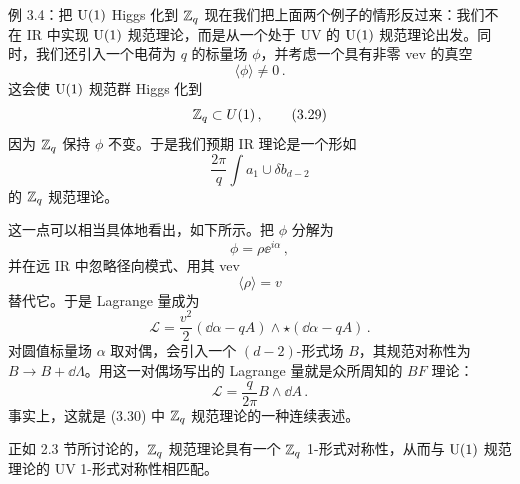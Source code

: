 \begin{examplebox}{例 3.4：把 $\mathrm{U}(1)$ Higgs 化到 $\mathbb{Z}_q$}
现在我们把上面两个例子的情形反过来：我们不在 IR 中实现 $\mathrm{U}(1)$ 规范理论，而是从一个处于 UV 的 $\mathrm{U}(1)$ 规范理论出发。同时，我们还引入一个电荷为 $q$ 的标量场 $\phi$，并考虑一个具有非零 vev 的真空
\begin{equation}
  \langle\phi\rangle\neq 0\,. \tag{3.28}
\end{equation}
这会使 $\mathrm{U}(1)$ 规范群 Higgs 化到
\begin{equation}
  \mathbb{Z}_q\subset U(1)\,, \tag{3.29}
\end{equation}
因为 $\mathbb{Z}_q$ 保持 $\phi$ 不变。于是我们预期 IR 理论是一个形如
\begin{equation}
  \frac{2\pi}{q}\int a_1\cup\delta b_{d-2} \tag{3.30}
\end{equation}
的 $\mathbb{Z}_q$ 规范理论。

这一点可以相当具体地看出，如下所示。把 $\phi$ 分解为
\begin{equation}
  \phi=\rho \ee^{i\alpha}\,, \tag{3.31}
\end{equation}
并在远 IR 中忽略径向模式、用其 vev
\begin{equation}
  \langle\rho\rangle=v \tag{3.32}
\end{equation}
替代它。于是 Lagrange 量成为
\begin{equation}
  \mathcal{L}=\frac{v^2}{2}(\dd\alpha-qA)\wedge\star(\dd\alpha-qA)\,. \tag{3.33}
\end{equation}
对圆值标量场 $\alpha$ 取对偶，会引入一个 $(d-2)$-形式场 $B$，其规范对称性为 $B\to B+\dd\Lambda$。用这一对偶场写出的 Lagrange 量就是众所周知的 $BF$ 理论：
\begin{equation}
  \mathcal{L}=\frac{q}{2\pi}B\wedge \dd A\,. \tag{3.34}
\end{equation}
事实上，这就是 (3.30) 中 $\mathbb{Z}_q$ 规范理论的一种连续表述。

正如 2.3 节所讨论的，$\mathbb{Z}_q$ 规范理论具有一个 $\mathbb{Z}_q$ 1-形式对称性，从而与 $\mathrm{U}(1)$ 规范理论的 UV 1-形式对称性相匹配。
\end{examplebox}


